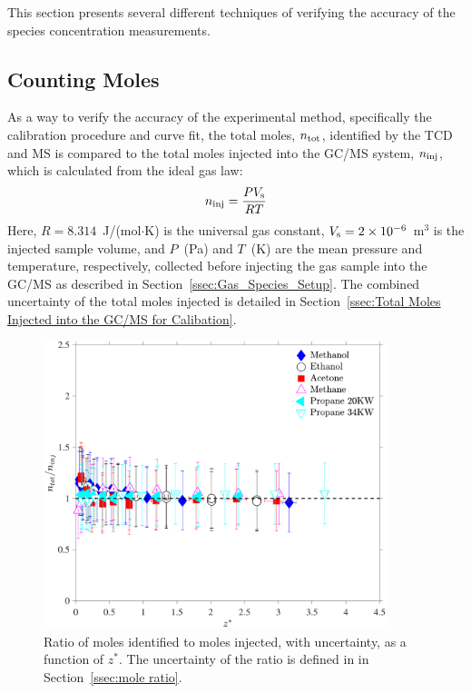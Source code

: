\documentclass[12pt]{article}
\begin{document}
This section presents several different techniques of verifying the accuracy of the species concentration measurements.


\subsection{Counting Moles}

As a way to verify the accuracy of the experimental method, specifically the calibration procedure and curve fit, the total moles, $n_{\rm tot}$, identified by the TCD and MS is compared to the total moles injected into the GC/MS system, $n_{\rm inj}$, which is calculated from the ideal gas law:
\begin{equation}\label{eq:moles_inj}
n_{\rm inj}=\frac{PV_{\rm s}}{RT}
\end{equation}
Here, $R=8.314$~J/(mol$\cdot$K) is the universal gas constant, $V_{\rm s}=2\times 10^{-6}$~m$^3$ is the injected sample volume, and $P$~(Pa) and $T$~(K) are the mean pressure and temperature, respectively, collected before injecting the gas sample into the GC/MS as described in Section~\ref{ssec:Gas_Species_Setup}. The combined uncertainty of the total moles injected is detailed in Section~\ref{ssec:Total Moles Injected into the GC/MS for Calibation}.

\begin{figure}[h!]
	\centering
\includegraphics[width=10.0cm,keepaspectratio]{mole_ratio_Comparison.pdf}
	\caption[Ratio of moles identified to moles injected]{Ratio of moles identified to moles injected, with uncertainty, as a function of $z^*$. The uncertainty of the ratio is defined in in Section~\ref{ssec:mole ratio}.}
	\label{fig:Mole_Comp}
\end{figure}
\end{document}
